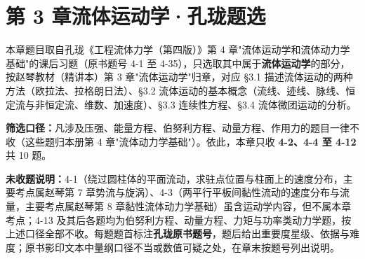 \chapter*{第 3 章\quad 流体运动学·孔珑题选}

\begin{tishi}
本章题目取自孔珑《工程流体力学（第四版）》第 4 章"流体运动学和流体动力学基础"的课后习题（原书题号 4-1 至 4-35），只选取其中属于\textbf{流体运动学}的部分，按赵琴教材（精讲本）第 3 章"流体运动学"归章，对应 \S 3.1 描述流体运动的两种方法（欧拉法、拉格朗日法）、\S 3.2 流体运动的基本概念（流线、迹线、脉线、恒定流与非恒定流、维数、加速度）、\S 3.3 连续性方程、\S 3.4 流体微团运动的分析。

\textbf{筛选口径：}凡涉及压强、能量方程、伯努利方程、动量方程、作用力的题目一律不收（这些题归本册第 4 章"流体动力学基础"）。依此，本章只收 \textbf{4-2、4-4 至 4-12} 共 10 题。

\textbf{未收题说明：}4-1（绕过圆柱体的平面流动，求驻点位置与柱面上的速度分布，主要考点属赵琴第 7 章势流与旋涡）、4-3（两平行平板间黏性流动的速度分布与流量，主要考点属赵琴第 8 章黏性流体动力学基础）虽含运动学内容，但不属本章考点；4-13 及其后各题均为伯努利方程、动量方程、力矩与功率类动力学题，按上述口径全部不收。每题题首标注\textbf{孔珑原书题号}，题后给出重要度星级、依据与难度；原书影印文本中量纲口径不当或数值可疑之处，在章末按题号列出说明。
\end{tishi}

